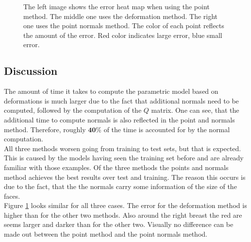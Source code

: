 \begin{figure}
\centering
{}
\caption[Input Data for PCA error heat map]{The left image shows the error heat map when using the point method. The middle one uses the deformation method. The right one uses the point normals method. The color of each point reflects the amount of the error. Red color indicates large error, blue small error.}
\label{fig:PDNheatmap}
\end{figure}

\subsection{Discussion}
The amount of time it takes to compute the parametric model based on deformations is much larger due to the fact that additional normals need to be computed, followed by the computation of the $Q$ matrix. One can see, that the additional time to compute normals is also reflected in the point and normals method. Therefore, roughly $\mathbf{40\%}$ of the time is accounted for by the normal computation.\\
All three methods worsen going from training to test sets, but that is expected. This is caused by the models having seen the training set before and are already familiar with those examples. Of the three methods the points and normals method achieves the best results over test and training. The reason this occurs is due to the fact, that the the normals carry some information of the size of the faces.\\
Figure \ref{fig:PDNheatmap} looks similar for all three cases. The error for the deformation method is higher than for the other two methods. Also around the right breast the red are seems larger and darker than for the other two. Visually no difference can be made out between the point method and the point normals method.


